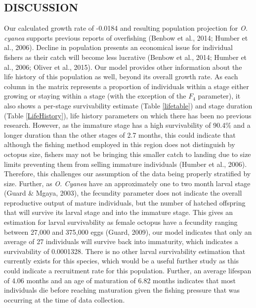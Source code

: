 \documentclass[
]{article}
\begin{document}
\hypertarget{discussion}{%
\subsection{DISCUSSION}\label{discussion}}

Our calculated growth rate of -0.0184 and resulting population projection for \emph{O. cyanea} supports previous reports of overfishing (Benbow et al., 2014; Humber et al., 2006). Decline in population presents an economical issue for individual fishers as their catch will become less lucrative (Benbow et al., 2014; Humber et al., 2006; Oliver et al., 2015). Our model provides other information about the life history of this population as well, beyond its overall growth rate. As each column in the matrix represents a proportion of individuals within a stage either growing or staying within a stage (with the exception of the \(F_4\) parameter), it also shows a per-stage survivability estimate (Table \ref{lifetable}) and stage duration (Table \ref{LifeHistory}), life history parameters on which there has been no previous research. However, as the immature stage has a high survivability of 90.4\% and a longer duration than the other stages of 2.7 months, this could indicate that although the fishing method employed in this region does not distinguish by octopus size, fishers may not be bringing this smaller catch to landing due to size limits preventing them from selling immature individuals (Humber et al., 2006). Therefore, this challenges our assumption of the data being properly stratified by size. Further, as \emph{O. Cyanea} have an approximately one to two month larval stage (Guard \& Mgaya, 2003), the fecundity parameter does not indicate the overall reproductive output of mature individuals, but the number of hatched offspring that will survive its larval stage and into the immature stage. This gives an estimation for larval survivability as female octopus have a fecundity ranging between 27,000 and 375,000 eggs (Guard, 2009), our model indicates that only an average of 27 individuals will survive back into immaturity, which indicates a survivability of 0.0001328. There is no other larval survivability estimation that currently exists for this species, which would be a useful further study as this could indicate a recruitment rate for this population. Further, an average lifespan of 4.06 months and an age of maturation of 6.82 months indicates that most individuals die before reaching maturation given the fishing pressure that was occurring at the time of data collection.
\end{document}
